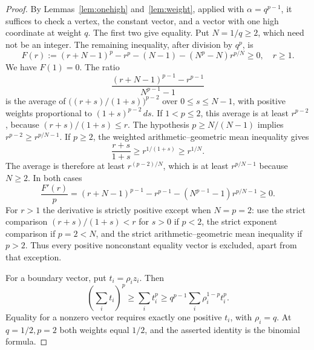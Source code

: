 \documentclass[11pt,a4paper]{article}
\numberwithin{equation}{section}
\theoremstyle{definition}
\theoremstyle{remark}
\begin{document}
\begin{proof}
By Lemmas~\ref{lem:onehigh} and~\ref{lem:weight}, applied with
\(\alpha=q^{p-1}\), it suffices to check a vertex, the constant vector,
and a vector with one high coordinate at weight \(q\). The first two
give equality. Put \(N=1/q\ge2\), which need not be an integer.
The remaining inequality, after division by \(q^p\), is
\begin{equation}\label{eq:F}
F(r):=(r+N-1)^p-r^p-(N-1)-(N^p-N)r^{p/N}\ge0,
\quad r\ge1.
\end{equation}
We have \(F(1)=0\). The ratio
\[
\frac{(r+N-1)^{p-1}-r^{p-1}}{N^{p-1}-1}
\]
is the average of \(\big((r+s)/(1+s)\big)^{p-2}\) over \(0\le s\le N-1\),
with positive weights proportional to \((1+s)^{p-2}\,ds\).
If \(1<p\le2\), this average is at least \(r^{p-2}\), because
\((r+s)/(1+s)\le r\). The hypothesis \(p\ge N/(N-1)\) implies
\(r^{p-2}\ge r^{p/N-1}\).
If \(p\ge2\), the weighted arithmetic--geometric mean inequality gives
\[
\frac{r+s}{1+s}\ge r^{1/(1+s)}\ge r^{1/N}.
\]
The average is therefore at least \(r^{(p-2)/N}\), which is at least
\(r^{p/N-1}\) because \(N\ge2\). In both cases
\[
\frac{F'(r)}p=(r+N-1)^{p-1}-r^{p-1}
 -(N^{p-1}-1)r^{p/N-1}\ge0.
\]
For \(r>1\) the derivative is strictly positive except when \(N=p=2\):
use the strict comparison \((r+s)/(1+s)<r\) for \(s>0\) if \(p<2\), the
strict exponent comparison if \(p=2<N\), and the strict
arithmetic--geometric mean inequality if \(p>2\). Thus every positive
nonconstant equality vector is excluded, apart from that exception.

For a boundary vector, put \(t_i=\rho_i z_i\). Then
\[
\left(\sum_i t_i\right)^p\ge\sum_i t_i^p
\ge q^{p-1}\sum_i\rho_i^{1-p}t_i^p .
\]
Equality for a nonzero vector requires exactly one positive \(t_i\),
with \(\rho_i=q\). At \(q=1/2,p=2\) both weights equal \(1/2\), and the
asserted identity is the binomial formula.
\end{proof}
\end{document}

